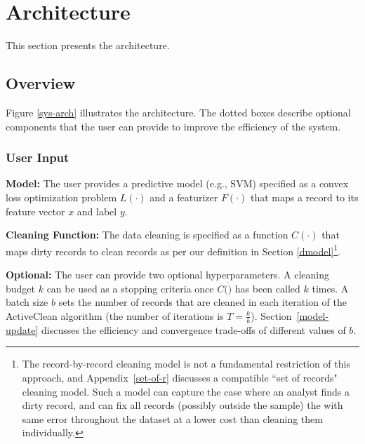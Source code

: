 \section{Architecture}\label{arch}
\noindent This section presents the \sys architecture.

\subsection{Overview}\label{sysover}
Figure \ref{sys-arch} illustrates the \sys architecture.
The dotted boxes describe optional components that the user can provide to improve the efficiency of the system.  

\subsubsection{User Input}\label{uinp}

\noindent\textbf{Model:} The user provides a predictive model (e.g., SVM) specified as a convex loss optimization problem $L(\cdot)$ and a featurizer $F(\cdot)$ that maps a record to its feature vector $x$ and label $y$.

\vspace{0.25em}

\noindent\textbf{Cleaning Function: } The data cleaning is specified as a function $C(\cdot)$ that maps dirty records to clean records as per our definition in Section \ref{dmodel}\footnote{\small The record-by-record cleaning model is not a fundamental restriction of this approach, and Appendix~\ref{set-of-r} discusses a compatible ``set of records" cleaning model.
Such a model can capture the case where an analyst finds a dirty record, and can fix all records (possibly outside the sample) the with same error throughout the dataset at a lower cost than cleaning them individually.}.

\vspace{0.25em}

\noindent\textbf{Optional: } The user can provide two optional hyperparameters.  
A cleaning budget $k$ can be used as a stopping criteria once $C(\dot)$ has been called $k$ times.
A batch size $b$ sets the number of records that are cleaned in each iteration of the ActiveClean algorithm (the number of iterations is $T = \frac{k}{b}$).
Section~\ref{model-update} discusses the efficiency and convergence trade-offs of different values of $b$.

